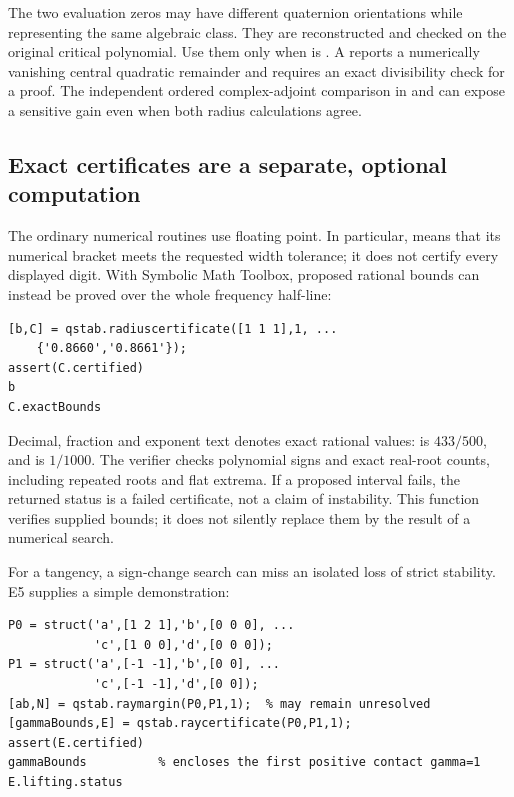 The two evaluation zeros may have different quaternion orientations while
representing the same algebraic class. They are reconstructed and checked
on the original critical polynomial. Use them only when  is
. A  reports a numerically vanishing
central quadratic remainder and requires an exact divisibility check for
a proof. The independent ordered complex-adjoint comparison in
 and  can expose a sensitive gain
even when both radius calculations agree.

\subsection{Exact certificates are a separate, optional computation}
The ordinary numerical routines use floating point. In particular,
 means that its numerical bracket meets the requested
width tolerance; it does not certify every displayed digit.
With Symbolic Math Toolbox, proposed rational bounds can instead be proved
over the whole frequency half-line:
\begin{lstlisting}
[b,C] = qstab.radiuscertificate([1 1 1],1, ...
    {'0.8660','0.8661'});
assert(C.certified)
b
C.exactBounds
\end{lstlisting}
Decimal, fraction and exponent text denotes exact rational values:
 is $433/500$, and  is $1/1000$. The verifier checks
polynomial signs and exact real-root counts, including repeated roots and
flat extrema.
If a proposed interval fails, the returned status is a failed certificate,
not a claim of instability. This function verifies supplied bounds; it does
not silently replace them by the result of a numerical search.

For a tangency, a sign-change search can miss an isolated loss of strict
stability. E5 supplies a simple demonstration:

\begin{minipage}{\linewidth}
\begin{lstlisting}
P0 = struct('a',[1 2 1],'b',[0 0 0], ...
            'c',[1 0 0],'d',[0 0 0]);
P1 = struct('a',[-1 -1],'b',[0 0], ...
            'c',[-1 -1],'d',[0 0]);
[ab,N] = qstab.raymargin(P0,P1,1);  % may remain unresolved
[gammaBounds,E] = qstab.raycertificate(P0,P1,1);
assert(E.certified)
gammaBounds          % encloses the first positive contact gamma=1
E.lifting.status
\end{lstlisting}
\end{minipage}

